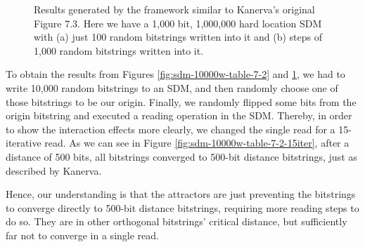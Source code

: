 \begin{figure}[h]
\centering
{}

\caption{Results generated by the framework similar to Kanerva's original Figure 7.3. Here we have a 1,000 bit, 1,000,000 hard location SDM with (a) just 100 random bitstrings written into it and (b) steps of 1,000 random bitstrings written into it.
\label{fig:sdm-100w-table-7-2}}
\end{figure}

To obtain the results from Figures \ref{fig:sdm-10000w-table-7-2} and \ref{fig:sdm-100w-table-7-2}, we had to write 10,000 random bitstrings to an SDM, and then randomly choose one of those bitstrings to be our origin. Finally, we randomly flipped some bits from the origin bitstring and executed a reading operation in the SDM. Thereby, in order to show the interaction effects more clearly, we changed the single read for a 15-iterative read. As we can see in Figure \ref{fig:sdm-10000w-table-7-2-15iter}, after a distance of 500 bits, all bitstrings converged to 500-bit distance bitstrings, just as described by Kanerva.

Hence, our understanding is that the attractors are just preventing the bitstrings to converge directly to 500-bit distance bitstrings, requiring more reading steps to do so. They are in other orthogonal bitstrings' critical distance, but sufficiently far not to converge in a single read.

